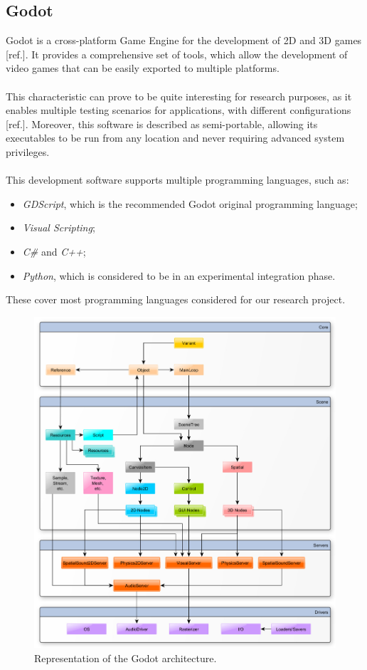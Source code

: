 \subsection{Godot}
Godot is a cross-platform Game Engine for the development of 2D and 3D games [ref.]. It provides a comprehensive set of tools, which allow the development of video games that can be easily exported to multiple platforms. \\ \\
This characteristic can prove to be quite interesting for research purposes, as it enables multiple testing scenarios for applications, with different configurations [ref.]. Moreover, this software is described as semi-portable, allowing its executables to be run from any location and never requiring advanced system privileges. \\ \\
This development software supports multiple programming languages, such as:
\begin{itemize}
	\item \textit{GDScript}, which is the recommended Godot original programming language;
	\item \textit{Visual Scripting};
	\item \textit{C\#} and \textit{C++};
	\item \textit{Python}, which is considered to be in an experimental integration phase.
\end{itemize}
These cover most programming languages considered for our research project.
\begin{figure}[h!]
	\centering
	\includegraphics[width=0.9\linewidth]{"immagini/Feasibility study/architecture_diagram"}
	\caption[Representation of the Godot architecture.]{Representation of the Godot architecture.}
	\label{fig:architecture-diagram}
\end{figure}
